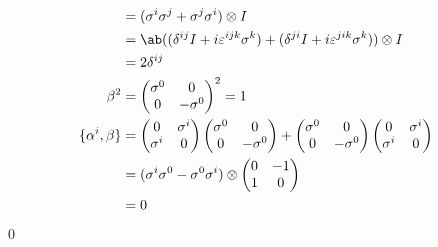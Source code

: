 \documentclass[uplatex,dvipdfmx,a4paper,11pt]{jlreq}
\makeatletter
\numberwithin{equation}{section}
\theoremstyle{definition}
\renewenvironment{proof}[1][\proofname]{\par
  \normalfont
  \topsep6\p@\@plus6\p@ \trivlist
  \item[\hskip\labelsep{\bfseries #1}\@addpunct{\bfseries}]\ignorespaces\quad\par
}{%
  \qed\endtrivlist\@endpefalse
}
\renewcommand\proofname{証明}
\makeatother
\begin{document}
\begin{proof}
\begin{align}
                                     & = (\sigma^i\sigma^j + \sigma^j\sigma^i)\otimes I                                                          \\
                                     & = \ab((\delta^{ij}I + i\varepsilon^{ijk}\sigma^k) + (\delta^{ji}I + i\varepsilon^{jik}\sigma^k))\otimes I \\
                                     & = 2\delta^{ij}                                                                                            \\
    \beta^2                          & = \begin{pmatrix}
                                           \sigma^0 & 0         \\
                                           0        & -\sigma^0
                                         \end{pmatrix}^2 = 1                                                                                    \\
    \lbrace\alpha^i, \beta\rbrace    & = \begin{pmatrix}
                                           0        & \sigma^i \\
                                           \sigma^i & 0
                                         \end{pmatrix}
    \begin{pmatrix}
      \sigma^0 & 0         \\
      0        & -\sigma^0
    \end{pmatrix} +
    \begin{pmatrix}
      \sigma^0 & 0         \\
      0        & -\sigma^0
    \end{pmatrix}
    \begin{pmatrix}
      0        & \sigma^i \\
      \sigma^i & 0
    \end{pmatrix}                                                                                                                          \\
                                     & = (\sigma^i\sigma^0 - \sigma^0\sigma^i)\otimes\begin{pmatrix}
                                                                                       0 & -1 \\
                                                                                       1 & 0
                                                                                     \end{pmatrix}                                              \\
                                     & = 0
  \end{align}
\end{proof}
\end{document}

